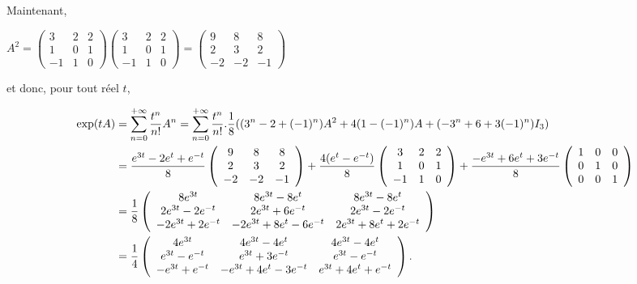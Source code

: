 {\begin{enumerate}
{Maintenant,

\begin{center}
$A^2=\left(
\begin{array}{ccc}
3&2&2\\
1&0&1\\
-1&1&0
\end{array}
\right)\left(
\begin{array}{ccc}
3&2&2\\
1&0&1\\
-1&1&0
\end{array}
\right)=\left(
\begin{array}{ccc}
9&8&8\\
2&3&2\\
-2&-2&-1
\end{array}
\right)$
\end{center}

et donc, pour tout réel $t$,

\begin{align*}\ensuremath
\text{exp}(tA)&=\sum_{n=0}^{+\infty} \frac{t^n}{n!}A^n=\sum_{n=0}^{+\infty} \frac{t^n}{n!}. \frac{1}{8}((3^n-2+(-1)^n)A^2+4(1-(-1)^n)A+(-3^n+6+3(-1)^n)I_3)\\
 &= \frac{e^{3t}-2e^t+e^{-t}}{8}\left(
\begin{array}{ccc}
9&8&8\\
2&3&2\\
-2&-2&-1
\end{array}
\right)+ \frac{4(e^t-e^{-t})}{8}\left(
\begin{array}{ccc}
3&2&2\\
1&0&1\\
-1&1&0
\end{array}
\right)+ \frac{-e^{3t}+6e^t+3e^{-t}}{8}\left(
\begin{array}{ccc}
1&0&0\\
0&1&0\\
0&0&1
\end{array}
\right)\\
&= \frac{1}{8}\left(
\begin{array}{ccc}
8e^{3t}&8e^{3t}-8e^t&8e^{3t}-8e^t\\
2e^{3t}-2e^{-t}&2e^{3t}+6e^{-t}&2e^{3t}-2e^{-t}\\
-2e^{3t}+2e^{-t}&-2e^{3t}+8e^t-6e^{-t}&2e^{3t}+8e^t+2e^{-t}
\end{array}
\right)\\
 &= \frac{1}{4}\left(
\begin{array}{ccc}
4e^{3t}&4e^{3t}-4e^t&4e^{3t}-4e^t\\
e^{3t}-e^{-t}&e^{3t}+3e^{-t}&e^{3t}-e^{-t}\\
-e^{3t}+e^{-t}&-e^{3t}+4e^t-3e^{-t}&e^{3t}+4e^t+e^{-t}
\end{array}
\right).
\end{align*}

}
\end{enumerate}}
